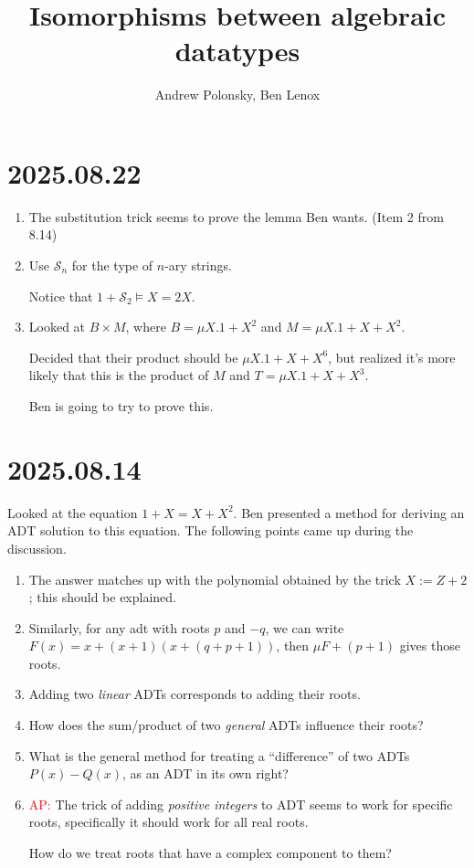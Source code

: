 \documentclass[letterpaper,numbers=enddot]{scrartcl}
\title{Isomorphisms between algebraic datatypes}
\author{Andrew Polonsky, Ben Lenox}
\newcommand{\mcS}{\mathcal{S}}
\newcommand{\hired}[1]{\textcolor{Red}{#1}}
\begin{document}
\section*{2025.08.22}
\begin{enumerate}
  \item The substitution trick seems to prove the lemma Ben wants.
  (Item 2 from 8.14)
  \item Use $\mcS_n$ for the type of $n$-ary strings.

  Notice that $1 + \mcS_2 \models X = 2X$.

  \item Looked at $B \times M$, where $B = \mu X. 1 + X^2$ and $M = \mu X. 1 + X + X^2$.

  Decided that their product should be $\mu X. 1 + X + X^6$, but realized it's more likely
  that this is the product of $M$ and $T = \mu X. 1 + X + X^3$.

  Ben is going to try to prove this.
\end{enumerate}

\section*{2025.08.14}

Looked at the equation $1 + X = X + X^2$.
Ben presented a method for deriving an ADT solution to this equation.
The following points came up during the discussion.
\begin{enumerate}
  \item The answer matches up with the polynomial obtained by the trick
  $X := Z + 2$; this should be explained.
  \item Similarly, for any adt with roots $p$ and $-q$, we can
  write $F(x) = x + (x+1)(x+(q+p+1))$, then $\mu F + (p+1)$ gives those roots.
  \item Adding two \emph{linear} ADTs corresponds to adding their roots.
  \item How does the sum/product of two \emph{general} ADTs influence their
  roots?
  \item What is the general method for treating a ``difference'' of two
  ADTs $P(x) - Q(x)$, as an ADT in its own right?
  \item \hired{AP:} The trick of adding \emph{positive integers} to ADT
  seems to work for specific roots, specifically it should work for all real roots.

  How do we treat roots that have a complex component to them?
\end{enumerate}
\end{document}

